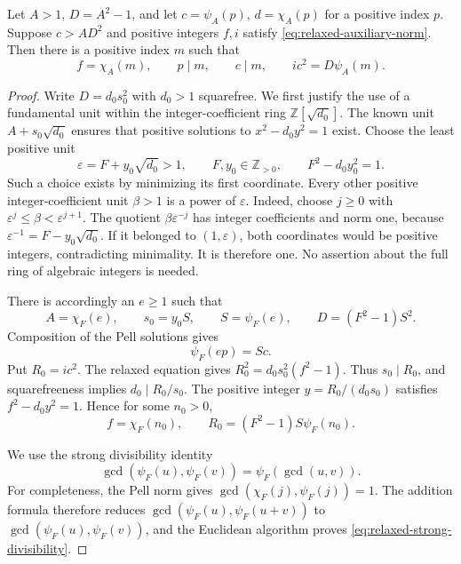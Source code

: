 \begin{lemma}\label{lem:relaxed-pell-integrality}
Let $A>1$, $D=A^2-1$, and let
$c=\psi_A(p)$, $d=\chi_A(p)$ for a positive index $p$.
Suppose $c>A D^2$ and positive integers $f,i$ satisfy
\eqref{eq:relaxed-auxiliary-norm}. Then there is a positive index $m$
such that
\[
 f=\chi_A(m),\qquad p\mid m,\qquad c\mid m,
 \qquad ic^2=D\psi_A(m).
\]
\end{lemma}
\begin{proof}
Write $D=d_0s_0^2$ with $d_0>1$ squarefree. We first justify the
use of a fundamental unit within the integer-coefficient ring
$\mathbb Z[\sqrt{d_0}]$. The known unit $A+s_0\sqrt{d_0}$ ensures
that positive solutions to $x^2-d_0y^2=1$ exist. Choose the least
positive unit
\[
 \varepsilon=F+y_0\sqrt{d_0}>1,
 \qquad F,y_0\in\mathbb Z_{>0},\qquad
 F^2-d_0y_0^2=1.
\]
Such a choice exists by minimizing its first coordinate. Every other
positive integer-coefficient unit $\beta>1$ is a power of
$\varepsilon$. Indeed, choose $j\ge0$ with
$\varepsilon^j\le\beta<\varepsilon^{j+1}$. The quotient
$\beta\varepsilon^{-j}$ has integer coefficients and norm one,
because $\varepsilon^{-1}=F-y_0\sqrt{d_0}$. If it belonged to
$(1,\varepsilon)$, both coordinates would be positive integers,
contradicting minimality. It is therefore one. No assertion about
the full ring of algebraic integers is needed.

There is accordingly an $e\ge1$ such that
\[
 A=\chi_F(e),\qquad s_0=y_0S,\qquad
 S=\psi_F(e),\qquad D=(F^2-1)S^2.
\]
Composition of the Pell solutions gives
\begin{equation}\label{eq:relaxed-composed-coordinate}
 \psi_F(ep)=Sc.
\end{equation}
Put $R_0=ic^2$. The relaxed equation gives
$R_0^2=d_0s_0^2(f^2-1)$. Thus $s_0\mid R_0$, and squarefreeness
implies $d_0\mid R_0/s_0$. The positive integer
$y=R_0/(d_0s_0)$ satisfies $f^2-d_0y^2=1$. Hence for some
$n_0>0$,
\begin{equation}\label{eq:relaxed-field-coordinate}
 f=\chi_F(n_0),\qquad
 R_0=(F^2-1)S\psi_F(n_0).
\end{equation}

We use the strong divisibility identity
\begin{equation}\label{eq:relaxed-strong-divisibility}
 \gcd(\psi_F(u),\psi_F(v))=\psi_F(\gcd(u,v)).
\end{equation}
For completeness, the Pell norm gives
$\gcd(\chi_F(j),\psi_F(j))=1$. The addition formula therefore
reduces $\gcd(\psi_F(u),\psi_F(u+v))$ to
$\gcd(\psi_F(u),\psi_F(v))$, and the Euclidean algorithm proves
\eqref{eq:relaxed-strong-divisibility}.


\end{proof}
